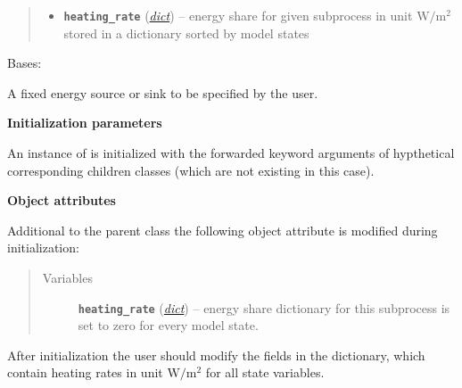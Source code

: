 \documentclass[letterpaper,10pt,english]{sphinxmanual}
\begin{document}
\begin{fulllineitems}
\begin{quote}
\begin{description}
\begin{itemize}
\item {} 
\textbf{\texttt{heating\_rate}} (\href{http://docs.python.org/2.7/library/stdtypes.html\#dict}{\emph{dict}}) -- energy share for given subprocess in unit 
\(\textrm{W}/ \textrm{m}^2\) stored 
in a dictionary sorted by model states

\end{itemize}

\end{description}\end{quote}

\end{fulllineitems}


\begin{fulllineitems}
\label{api/climlab.process:climlab.process.energy_budget.ExternalEnergySource}
Bases: {\hyperref[api/climlab.process:climlab.process.energy_budget.EnergyBudget]{\emph{}}}

A fixed energy source or sink to be specified by the user.

\textbf{Initialization parameters}

An instance of  is initialized with the forwarded 
keyword arguments  of hypthetical corresponding children classes
(which are not existing in this case).

\textbf{Object attributes}

Additional to the parent class {\hyperref[api/climlab.process:climlab.process.energy_budget.EnergyBudget]{\emph{}}}
the following object attribute is modified during initialization:
\begin{quote}\begin{description}
\item[{Variables}] \leavevmode
\textbf{\texttt{heating\_rate}} (\href{http://docs.python.org/2.7/library/stdtypes.html\#dict}{\emph{dict}}) -- energy share dictionary for this subprocess
is set to zero for every model state.

\end{description}\end{quote}

After initialization the user should modify the fields in the 
 dictionary, which contain heating rates in 
unit \(\textrm{W}/ \textrm{m}^2\) for all state variables.

\end{fulllineitems}
\end{document}
